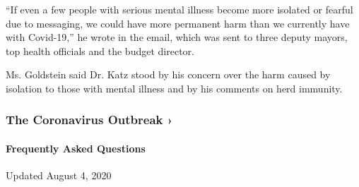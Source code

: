 ``If even a few people with serious mental illness become more isolated
or fearful due to messaging, we could have more permanent harm than we
currently have with Covid-19,'' he wrote in the email, which was sent to
three deputy mayors, top health officials and the budget director.

Ms. Goldstein said Dr. Katz stood by his concern over the harm caused by
isolation to those with mental illness and by his comments on herd
immunity.

\href{https://www.nytimes3xbfgragh.onion/news-event/coronavirus?action=click\&pgtype=Article\&state=default\&region=MAIN_CONTENT_3\&context=storylines_faq}{}

\hypertarget{the-coronavirus-outbreak-}{%
\subsubsection{The Coronavirus Outbreak
›}\label{the-coronavirus-outbreak-}}

\hypertarget{frequently-asked-questions}{%
\paragraph{Frequently Asked
Questions}\label{frequently-asked-questions}}

Updated August 4, 2020

